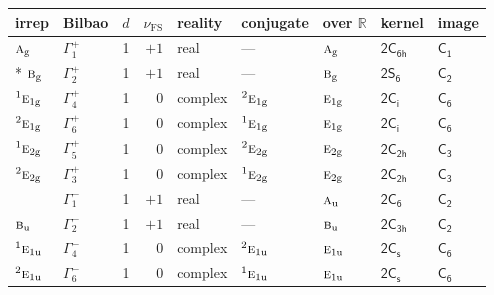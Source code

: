 \documentclass[10pt,a4paper]{article}
\numberwithin{equation}{section}
\newcommand{\grp}[1]{\mathsf{#1}}
\newcommand{\irr}[1]{\text{\normalfont\scshape #1}}
\newcommand{\conjpair}[1]{{}^{#1}}
\newcommand{\detbox}[1]{{\setlength{\fboxsep}{1pt}\fbox{#1}}}
\newcommand{\ptag}[1]{\mathrm{#1}}
\newcommand{\fsind}{\nu_{\mathrm{FS}}}
\begin{document}
{\small\renewcommand{\arraystretch}{1.25}\setlength{\tabcolsep}{4pt}\begin{longtable}{@{}llrrlllll@{}}\toprule
irrep & Bilbao & $d$ & $\fsind$ & reality & conjugate & over $\mathbb{R}$ & kernel & image\\\midrule\endhead
\bottomrule\endfoot\endlastfoot
$\irr{a}_{\ptag{g}}$ & $\Gamma_{1}^{+}$ & 1 & $+1$ & real & --- & $\irr{a}_{\ptag{g}}$ & \href{2C6h.pdf}{$\grp{2C_{6h}}$} & \href{../../../rotation/data/pdf/C1.pdf}{$\grp{C_{1}}$}\\*
$\irr{b}_{\ptag{g}}$ & $\Gamma_{2}^{+}$ & 1 & $+1$ & real & --- & $\irr{b}_{\ptag{g}}$ & \href{2S6.pdf}{$\grp{2S_{6}}$} & \href{../../../rotation/data/pdf/C2.pdf}{$\grp{C_{2}}$}\\
$\conjpair{1}\irr{e}_{1\ptag{g}}$ & $\Gamma_{4}^{+}$ & 1 & $0$ & complex & $\conjpair{2}\irr{e}_{1\ptag{g}}$ & $\irr{e}_{1\ptag{g}}$ & \href{2S2.pdf}{$\grp{2C_{i}}$} & \href{../../../rotation/data/pdf/C6.pdf}{$\grp{C_{6}}$}\\
$\conjpair{2}\irr{e}_{1\ptag{g}}$ & $\Gamma_{6}^{+}$ & 1 & $0$ & complex & $\conjpair{1}\irr{e}_{1\ptag{g}}$ & $\irr{e}_{1\ptag{g}}$ & \href{2S2.pdf}{$\grp{2C_{i}}$} & \href{../../../rotation/data/pdf/C6.pdf}{$\grp{C_{6}}$}\\
$\conjpair{1}\irr{e}_{2\ptag{g}}$ & $\Gamma_{5}^{+}$ & 1 & $0$ & complex & $\conjpair{2}\irr{e}_{2\ptag{g}}$ & $\irr{e}_{2\ptag{g}}$ & \href{2C2h.pdf}{$\grp{2C_{2h}}$} & \href{../../../rotation/data/pdf/C3.pdf}{$\grp{C_{3}}$}\\
$\conjpair{2}\irr{e}_{2\ptag{g}}$ & $\Gamma_{3}^{+}$ & 1 & $0$ & complex & $\conjpair{1}\irr{e}_{2\ptag{g}}$ & $\irr{e}_{2\ptag{g}}$ & \href{2C2h.pdf}{$\grp{2C_{2h}}$} & \href{../../../rotation/data/pdf/C3.pdf}{$\grp{C_{3}}$}\\
\detbox{$\irr{a}_{\ptag{u}}$} & $\Gamma_{1}^{-}$ & 1 & $+1$ & real & --- & $\irr{a}_{\ptag{u}}$ & \href{2C6.pdf}{$\grp{2C_{6}}$} & \href{../../../rotation/data/pdf/C2.pdf}{$\grp{C_{2}}$}\\
$\irr{b}_{\ptag{u}}$ & $\Gamma_{2}^{-}$ & 1 & $+1$ & real & --- & $\irr{b}_{\ptag{u}}$ & \href{2C3h.pdf}{$\grp{2C_{3h}}$} & \href{../../../rotation/data/pdf/C2.pdf}{$\grp{C_{2}}$}\\
$\conjpair{1}\irr{e}_{1\ptag{u}}$ & $\Gamma_{4}^{-}$ & 1 & $0$ & complex & $\conjpair{2}\irr{e}_{1\ptag{u}}$ & $\irr{e}_{1\ptag{u}}$ & \href{2C1v.pdf}{$\grp{2C_{s}}$} & \href{../../../rotation/data/pdf/C6.pdf}{$\grp{C_{6}}$}\\
$\conjpair{2}\irr{e}_{1\ptag{u}}$ & $\Gamma_{6}^{-}$ & 1 & $0$ & complex & $\conjpair{1}\irr{e}_{1\ptag{u}}$ & $\irr{e}_{1\ptag{u}}$ & \href{2C1v.pdf}{$\grp{2C_{s}}$} & \href{../../../rotation/data/pdf/C6.pdf}{$\grp{C_{6}}$}\\

\end{longtable}}
\end{document}
